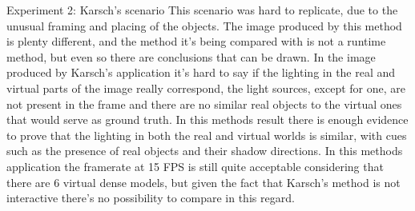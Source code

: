 Experiment 2: Karsch's scenario  \newline
This scenario was hard to replicate, due to the unusual framing and placing of the objects. The image produced by this method is plenty different, and the method it's being compared with is not a runtime method, but even so there are conclusions that can be drawn. In the image produced by Karsch's application it's hard to say if the lighting in the real and virtual parts of the image really correspond, the light sources, except for one, are not present in the frame and there are no similar real objects to the virtual ones that would serve as ground truth. In this methods result there is enough evidence to prove that the lighting in both the real and virtual worlds is similar, with cues such as the presence of real objects and their shadow directions.\newline
In this methods application the framerate at 15 FPS is still quite acceptable considering that there are 6 virtual dense models, but given the fact that Karsch's method is not interactive there's no possibility to compare in this regard.
